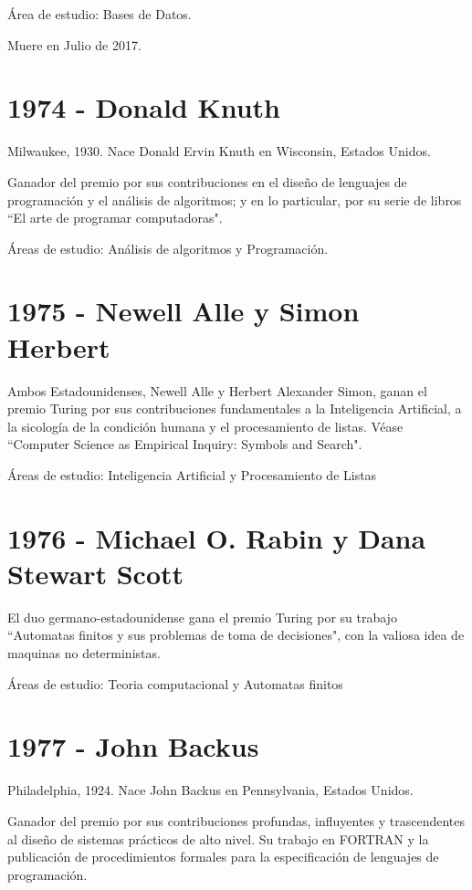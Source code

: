 \documentclass[a4paper, 11pt]{article}
\begin{document}
\noindent Área de estudio: Bases de Datos.

\noindent Muere en Julio de 2017.
\newline

\section*{1974 - Donald Knuth}
\noindent Milwaukee, 1930. Nace Donald Ervin Knuth en Wisconsin, Estados Unidos.

\noindent Ganador del premio por sus contribuciones en el diseño de lenguajes de programación y el análisis de algoritmos; y en lo particular, por su serie de libros ``El arte de programar computadoras".

\noindent Áreas de estudio: Análisis de algoritmos y Programación.
\newline

\section*{1975 - Newell Alle y Simon Herbert}
\noindent Ambos Estadounidenses, Newell Alle y Herbert Alexander Simon, ganan el premio Turing por sus contribuciones fundamentales a la Inteligencia Artificial, a la sicología de la condición humana y el procesamiento de listas. Véase ``Computer Science as Empirical Inquiry:
Symbols and Search".

\noindent Áreas de estudio: Inteligencia Artificial y Procesamiento de Listas
\newline

\section*{1976 - Michael O. Rabin y Dana Stewart Scott}
\noindent El duo germano-estadounidense gana el premio Turing por su trabajo ``Automatas finitos y sus problemas de toma de decisiones", con la valiosa idea de maquinas no deterministas.

\noindent Áreas de estudio: Teoria computacional y Automatas finitos
\newline

\section*{1977 - John Backus}
\noindent Philadelphia, 1924. Nace John Backus en Pennsylvania, Estados Unidos.

\noindent Ganador del premio por sus contribuciones profundas, influyentes y trascendentes al diseño de sistemas prácticos de alto nivel. Su trabajo en FORTRAN y la publicación de procedimientos formales para la especificación de lenguajes de programación.
\end{document}
